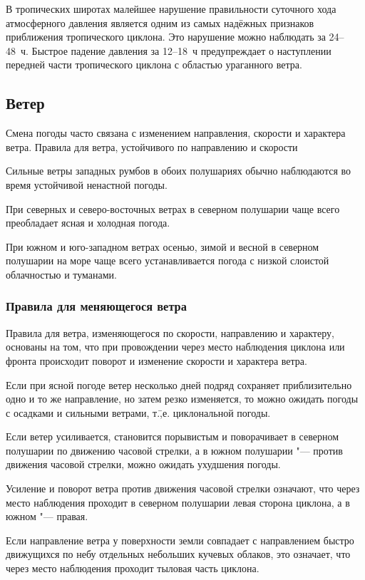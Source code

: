  В тропических широтах малейшее нарушение правильности
суточного хода атмосферного давления является одним из самых надёжных
признаков приближения тропического циклона. Это нарушение можно
наблюдать за 24--48~ч. Быстрое падение давления за 12--18~ч
предупреждает о наступлении передней части тропического циклона с
областью ураганного ветра.

\subsection{Ветер}

Смена погоды часто связана с изменением направления, скорости и
характера ветра.  Правила для ветра, устойчивого по направлению и
скорости

 Сильные ветры западных румбов в обоих полушариях обычно
наблюдаются во время устойчивой ненастной погоды.

 При северных и северо-восточных ветрах в северном полушарии
чаще всего преобладает ясная и холодная погода.

 При южном и юго-западном ветрах осенью, зимой и весной в северном
полушарии на море чаще всего устанавливается погода с низкой слоистой
облачностью и туманами.

\subsubsection{Правила для меняющегося ветра}

Правила для ветра, изменяющегося по скорости, направлению и характеру,
основаны на том, что при провождении через место наблюдения циклона
или фронта происходит поворот и изменение скорости и характера ветра.

 Если при ясной погоде ветер несколько дней подряд сохраняет
приблизительно одно и то же направление, но затем резко изменяется, то
можно ожидать погоды с осадками и сильными ветрами,
т.\=,е. циклональной погоды.

 Если ветер усиливается, становится порывистым и поворачивает в
северном полушарии по движению часовой стрелки, а в южном полушарии
"--- против движения часовой стрелки, можно ожидать ухудшения погоды.

 Усиление и поворот ветра против движения часовой стрелки
означают, что через место наблюдения проходит в северном полушарии
левая сторона циклона, а в южном "--- правая.

 Если направление ветра у поверхности земли совпадает с
направлением быстро движущихся по небу отдельных небольших кучевых
облаков, это означает, что через место наблюдения проходит тыловая
часть циклона.

